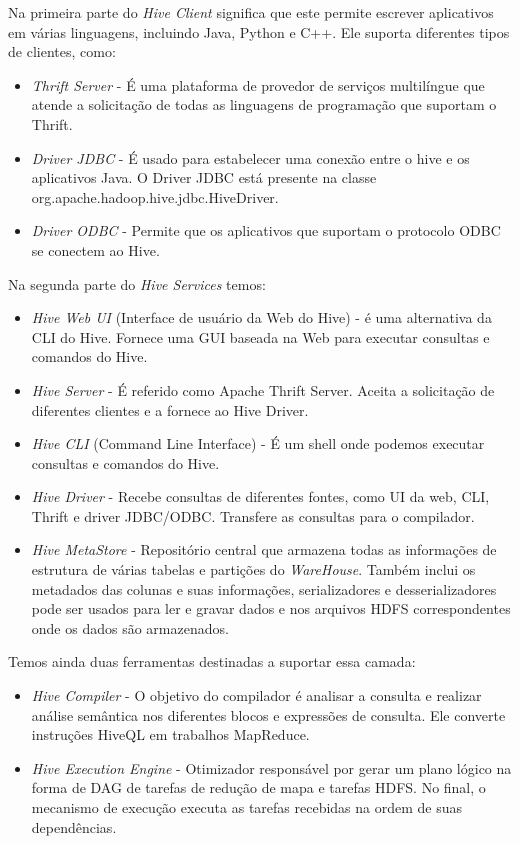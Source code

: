 \documentclass[a4paper,11pt]{article}
\begin{document}
Na primeira parte do \textit{Hive Client} significa que este permite escrever aplicativos em várias linguagens, incluindo Java, Python e C++. Ele suporta diferentes tipos de clientes, como:
\begin{itemize}
	\item \textit{Thrift Server} - É uma plataforma de provedor de serviços multilíngue que atende a solicitação de todas as linguagens de programação que suportam o Thrift.
	\item \textit{Driver JDBC} - É usado para estabelecer uma conexão entre o hive e os aplicativos Java. O Driver JDBC está presente na classe org.apache.hadoop.hive.jdbc.HiveDriver.
	\item \textit{Driver ODBC} - Permite que os aplicativos que suportam o protocolo ODBC se conectem ao Hive. 
\end{itemize}

Na segunda parte do \textit{Hive Services} temos:
\begin{itemize}
	\item \textit{Hive Web UI} (Interface de usuário da Web do Hive) - é uma alternativa da CLI do Hive. Fornece uma GUI baseada na Web para executar consultas e comandos do Hive.
	\item \textit{Hive Server} - É referido como Apache Thrift Server. Aceita a solicitação de diferentes clientes e a fornece ao Hive Driver.
	\item \textit{Hive CLI} (Command Line Interface) - É um shell onde podemos executar consultas e comandos do Hive.
	\item \textit{Hive Driver} - Recebe consultas de diferentes fontes, como UI da web, CLI, Thrift e driver JDBC/ODBC. Transfere as consultas para o compilador.
	\item \textit{Hive MetaStore} - Repositório central que armazena todas as informações de estrutura de várias tabelas e partições do \textit{WareHouse}. Também inclui os metadados das colunas e suas informações, serializadores e desserializadores pode ser usados para ler e gravar dados e nos arquivos HDFS correspondentes onde os dados são armazenados.
\end{itemize}

Temos ainda duas ferramentas destinadas a suportar essa camada: 
\begin{itemize}
	\item \textit{Hive Compiler} - O objetivo do compilador é analisar a consulta e realizar análise semântica nos diferentes blocos e expressões de consulta. Ele converte instruções HiveQL em trabalhos MapReduce.
	\item \textit{Hive Execution Engine} - Otimizador responsável por gerar um plano lógico na forma de DAG de tarefas de redução de mapa e tarefas HDFS. No final, o mecanismo de execução executa as tarefas recebidas na ordem de suas dependências. 
\end{itemize}
\end{document}
